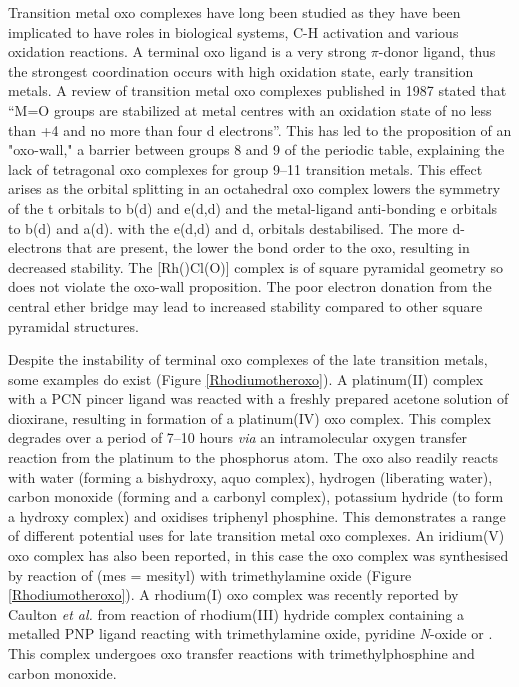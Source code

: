 Transition metal oxo complexes have long been studied as they have been implicated to have roles in  biological systems,\cite{Lipscomb1994, Merkx2001, Tinberg2011, Montellano2010} C-H activation\cite{Balcells2010, Borovik2011} and various oxidation reactions\cite{Holm1987, Atlay1983, Poverenov2008}.  A terminal oxo ligand is a very strong $\pi$-donor ligand, thus the strongest coordination occurs with high oxidation state, early transition metals\cite{Anderson2004}.  A review of transition metal oxo complexes published in 1987 stated that ``M=O groups are stabilized at metal centres with an oxidation state of no less than +4 and no more than four d electrons''.\cite{Holm1987}  This has led to the proposition of an "oxo-wall," a barrier between groups 8 and 9 of the periodic table, explaining the lack of tetragonal oxo complexes for group 9--11 transition metals.\cite{Winkler2011}  This effect arises as the orbital splitting in an octahedral oxo complex lowers the symmetry of the t orbitals to b(d) and e(d,d) and the metal-ligand anti-bonding e orbitals to b(d) and a(d).  with the e(d,d) and d, orbitals destabilised.\cite{Betley2008}  The more d-electrons that are present, the lower the bond order to the oxo, resulting in decreased stability.  The [Rh(\tBuxantphos)Cl(O)] complex is of square pyramidal geometry so does not violate the oxo-wall proposition.  The poor electron donation from the central ether bridge may lead to increased stability compared to other square pyramidal structures.  

Despite the instability of terminal oxo complexes of the late transition metals, some examples do exist (Figure \ref{Rhodiumotheroxo}).  A platinum(II) complex with a PCN pincer ligand was reacted with a freshly prepared acetone solution of dioxirane, resulting in formation of a platinum(IV) oxo complex.\cite{Poverenov2008}  This complex degrades over a period of 7--10 hours \emph{via} an intramolecular oxygen transfer reaction from the platinum to the phosphorus atom.  The oxo also readily reacts with water (forming a bishydroxy, aquo complex), hydrogen (liberating water), carbon monoxide (forming  and a carbonyl complex), potassium hydride (to form a hydroxy complex) and oxidises triphenyl phosphine.  This demonstrates a range of different potential uses for late transition metal oxo complexes.  An iridium(V) oxo complex has also been reported, in this case the oxo complex was synthesised by reaction of \ce{[Ir(mes)3]} (mes = mesityl) with trimethylamine oxide (Figure \ref{Rhodiumotheroxo}).\cite{Motherwell1993}  A rhodium(I) oxo complex was recently reported by Caulton \emph{et al.} from reaction of rhodium(III) hydride complex containing a metalled PNP ligand reacting with trimethylamine oxide, pyridine \emph{N}-oxide or .\cite{Verat2008, Tsvetkov2013}  This complex undergoes oxo transfer reactions with trimethylphosphine and carbon monoxide.

